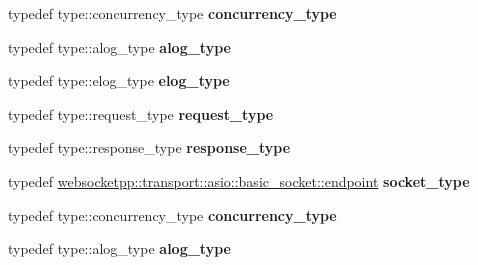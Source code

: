 \begin{DoxyCompactItemize}
\item 
\mbox{\label{structdeflate__config_1_1transport__config_a925c93714160292ca22a05562b714d96}} 
typedef type\+::concurrency\+\_\+type {\bfseries concurrency\+\_\+type}
\item 
\mbox{\label{structdeflate__config_1_1transport__config_a55da0657b8293c93d54bf15034992a6c}} 
typedef type\+::alog\+\_\+type {\bfseries alog\+\_\+type}
\item 
\mbox{\label{structdeflate__config_1_1transport__config_ad6fe90c4b26940ef1696730b15650597}} 
typedef type\+::elog\+\_\+type {\bfseries elog\+\_\+type}
\item 
\mbox{\label{structdeflate__config_1_1transport__config_afcb4f1eb606485891239ea097aa8e728}} 
typedef type\+::request\+\_\+type {\bfseries request\+\_\+type}
\item 
\mbox{\label{structdeflate__config_1_1transport__config_adbecbb47a37c12ca234b81c6aa54969b}} 
typedef type\+::response\+\_\+type {\bfseries response\+\_\+type}
\item 
\mbox{\label{structdeflate__config_1_1transport__config_adfda46e87b835fdab210455dec3fbc40}} 
typedef \mbox{\hyperlink{classwebsocketpp_1_1transport_1_1asio_1_1basic__socket_1_1endpoint}{websocketpp\+::transport\+::asio\+::basic\+\_\+socket\+::endpoint}} {\bfseries socket\+\_\+type}
\item 
\mbox{\label{structdeflate__config_1_1transport__config_a925c93714160292ca22a05562b714d96}} 
typedef type\+::concurrency\+\_\+type {\bfseries concurrency\+\_\+type}
\item 
\mbox{\label{structdeflate__config_1_1transport__config_a55da0657b8293c93d54bf15034992a6c}} 
typedef type\+::alog\+\_\+type {\bfseries alog\+\_\+type}
\item 
\mbox{\label{structdeflate__config_1_1transport__config_ad6fe90c4b26940ef1696730b15650597}} 

\end{DoxyCompactItemize}
